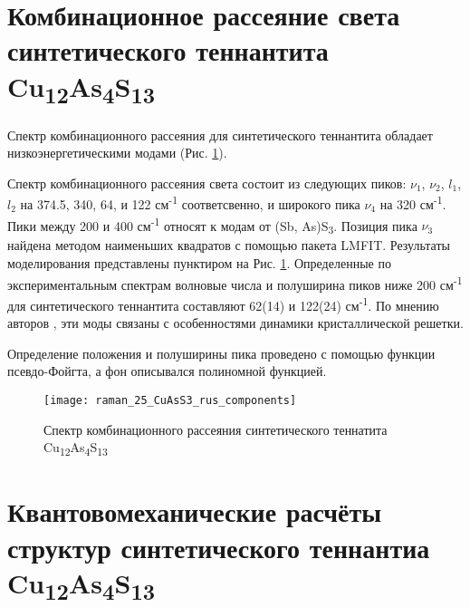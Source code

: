 \newpage



\section{Комбинационное рассеяние света синтетического теннантита Cu\textsubscript{12}As\textsubscript{4}S\textsubscript{13}} \label{sect3_3}

Спектр комбинационного рассеяния для синтетического теннантита обладает низкоэнергетическими модами (Рис. \ref{img:raman1a}).

Спектр комбинационного рассеяния света состоит из следующих пиков: $\nu_{1}$, $\nu_{2}$, $l_{1}$, $l_{2}$ на 374.5, 340, 64, и 122 см\textsuperscript{-1} соответсвенно, и широкого пика $\nu_{4}$ на 320 см\textsuperscript{-1}. Пики между 200 и 400 см\textsuperscript{-1} относят к модам от (Sb, As)S\textsubscript{3}\cite{Kharbish2007}. Позиция пика $\nu_{3}$ найдена методом наименьших квадратов с помощью пакета LMFIT.
Результаты моделирования представлены пунктиром на Рис. \ref{img:raman1a}. 
Определенные по экспериментальным спектрам волновые числа и полуширина пиков ниже 200 см\textsuperscript{-1} для синтетического теннантита составляют 62(14) и 122(24) см\textsuperscript{-1}.  По мнению авторов \cite{Buzatu2017}, эти моды связаны с особенностями динамики кристаллической решетки.

Определение положения  и  полуширины пика проведено с помощью функции псевдо-Фойгта, а фон описывался полиномной функцией.

\begin{figure}[h]
    \texttt{[image: raman\_25\_CuAsS3\_rus\_components]}

      \caption[Спектр комбинационного рассеяния синтетического теннатита Cu\textsubscript{12}As\textsubscript{4}S\textsubscript{13}]{Спектр комбинационного рассеяния синтетического теннатита Cu\textsubscript{12}As\textsubscript{4}S\textsubscript{13}}

    \label{img:raman1a}
\end{figure}

\newpage


\section{Квантовомеханические расчёты структур синтетического теннантиа Cu\textsubscript{12}As\textsubscript{4}S\textsubscript{13}} \label{sect3_4}

